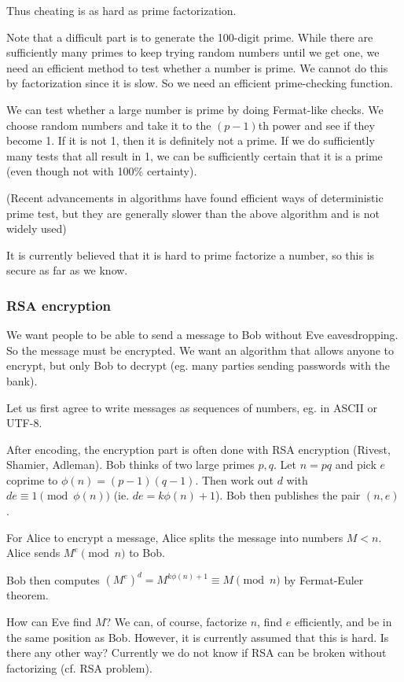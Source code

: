 \documentclass[a4paper]{article}
\begin{document}
Thus cheating is as hard as prime factorization.

Note that a difficult part is to generate the 100-digit prime. While there are sufficiently many primes to keep trying random numbers until we get one, we need an efficient method to test whether a number is prime. We cannot do this by factorization since it is slow. So we need an efficient prime-checking function.

We can test whether a large number is prime by doing Fermat-like checks. We choose random numbers and take it to the $(p - 1)$th power and see if they become 1. If it is not 1, then it is definitely not a prime. If we do sufficiently many tests that all result in 1, we can be sufficiently certain that it is a prime (even though not with 100\% certainty).

(Recent advancements in algorithms have found efficient ways of deterministic prime test, but they are generally slower than the above algorithm and is not widely used)

It is currently believed that it is hard to prime factorize a number, so this is secure as far as we know.
\subsubsection*{RSA encryption}

\begin{thm}
  We want people to be able to send a message to Bob without Eve eavesdropping. So the message must be encrypted. We want an algorithm that allows anyone to encrypt, but only Bob to decrypt (eg. many parties sending passwords with the bank).

  Let us first agree to write messages as sequences of numbers, eg. in ASCII or UTF-8.

  After encoding, the encryption part is often done with RSA encryption (Rivest, Shamier, Adleman). Bob thinks of two large primes $p, q$. Let $n = pq$ and pick $e$ coprime to $\phi(n) = (p - 1)(q - 1)$. Then work out $d$ with $de \equiv 1\pmod {\phi(n)}$ (ie. $de = k\phi(n) + 1$). Bob then publishes the pair $(n, e)$.

  For Alice to encrypt a message, Alice splits the message into numbers $M < n$. Alice sends $M^e \pmod n$ to Bob.

  Bob then computes $(M^e)^d = M^{k\phi(n) + 1} \equiv M\pmod n$ by Fermat-Euler theorem.

  How can Eve find $M$? We can, of course, factorize $n$, find $e$ efficiently, and be in the same position as Bob. However, it is currently assumed that this is hard. Is there any other way? Currently we do not know if RSA can be broken without factorizing (cf. RSA problem).
\end{thm}
\end{document}
